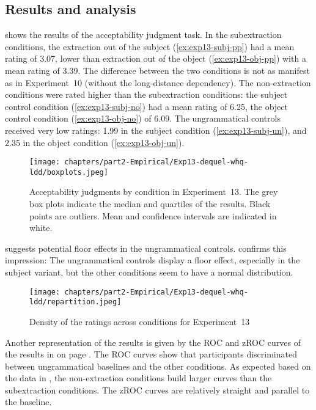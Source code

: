 \subsection{Results and analysis}

 shows the results of the acceptability judgment task.
In the subextraction conditions, the extraction out of the subject (\ref{ex:exp13-subj-pp}) had a mean  rating of 3.07, lower than extraction out of the object (\ref{ex:exp13-obj-pp}) with a mean rating of 3.39. The difference between the two conditions is not as manifest as in Experiment~10 (without the long-distance dependency). The non-extraction conditions were rated higher than the subextraction conditions: the subject control condition (\ref{ex:exp13-subj-no}) had a mean  rating of 6.25, the object control condition (\ref{ex:exp13-obj-no}) of 6.09. The ungrammatical controls received very low ratings: 1.99 in the subject condition (\ref{ex:exp13-subj-un}), and 2.35 in the object condition (\ref{ex:exp13-obj-un}). 

\begin{figure}
    \centering
    \texttt{[image: chapters/part2-Empirical/Exp13-dequel-whq-ldd/boxplots.jpeg]}
    \caption{Acceptability judgments by condition in Experiment~13. The grey box plots indicate the median and quartiles of the results. Black points are outliers. Mean and confidence intervals are indicated in white.}
    \label{fig:exp13-boxplot}
\end{figure}

 suggests potential floor effects in the ungrammatical controls.  confirms this impression: The ungrammatical controls display a floor effect, especially in the subject variant, but the other conditions seem to have a normal distribution.

\begin{figure}
    \centering
    \texttt{[image: chapters/part2-Empirical/Exp13-dequel-whq-ldd/repartition.jpeg]}
    \caption{Density of the ratings across conditions for Experiment~13}
    \label{fig:exp13-repartition}
\end{figure}

Another representation of the results is given by the ROC and zROC curves of the results in  on page \pageref{fig:exp13-ROC}. The ROC curves show that participants discriminated between ungrammatical baselines and the other conditions. As expected based on the data in , the non-extraction conditions build larger curves than the subextraction conditions. The zROC curves are relatively straight and parallel to the baseline. 

